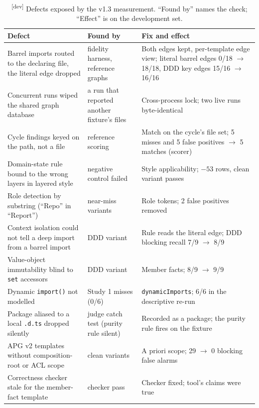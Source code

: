 \documentclass[10pt,a4paper]{article}
\newcommand{\devset}{\textsuperscript{\textsf{\tiny[dev]}}}
\begin{document}
\begin{table}[t]
\centering\footnotesize
\caption{\devset{} Defects exposed by the v1.3 measurement. ``Found by'' names the check; ``Effect'' is on the
development set.}
\label{tab:v13-defects}
\begin{tabularx}{\textwidth}{>{\raggedright\arraybackslash}p{3.6cm}>{\raggedright\arraybackslash}p{2.8cm}>{\raggedright\arraybackslash}X}
\toprule
Defect & Found by & Fix and effect \\
\midrule
Barrel imports routed to the declaring file, the literal edge dropped & fidelity harness, reference graphs &
Both edges kept, per-template edge view; literal barrel edges 0/18 $\to$ 18/18, DDD key edges 15/16 $\to$ 16/16 \\
Concurrent runs wiped the shared graph database & a run that reported another fixture's files & Cross-process
lock; two live runs byte-identical \\
Cycle findings keyed on the path, not a file & reference scoring & Match on the cycle's file set; 5 misses and 5
false positives $\to$ 5 matches (scorer) \\
Domain-state rule bound to the wrong layers in layered style & negative control failed & Style applicability; $-53$
rows, clean variant passes \\
Role detection by substring (``Repo'' in ``Report'') & near-miss variants & Role tokens; 2 false positives removed \\
Context isolation could not tell a deep import from a barrel import & DDD variant & Rule reads the literal edge;
DDD blocking recall 7/9 $\to$ 8/9 \\
Value-object immutability blind to \texttt{set} accessors & DDD variant & Member facts; 8/9 $\to$ 9/9 \\
Dynamic \texttt{import()} not modelled & Study 1 misses (0/6) & \texttt{dynamicImports}; 6/6 in the descriptive
re-run \\
Package aliased to a local \texttt{.d.ts} dropped silently & judge catch test (purity rule silent) & Recorded as a
package; the purity rule fires on the fixture \\
APG v2 templates without composition-root or ACL scope & clean variants & A priori scope; 29 $\to$ 0 blocking false
alarms \\
Correctness checker stale for the member-fact template & checker pass & Checker fixed; tool's claims were true \\
\bottomrule
\end{tabularx}

\end{table}
\end{document}
